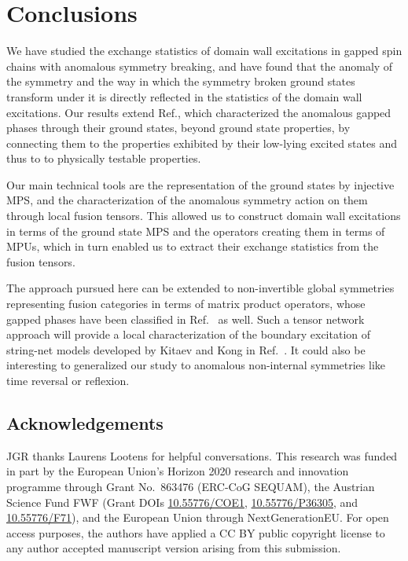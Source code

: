 \documentclass[aps,pra,export,nofootinbib]{revtex4-2}
\begin{document}
\section{Conclusions}
We have studied the exchange statistics of domain wall excitations in gapped spin chains with anomalous symmetry breaking, and have found that the anomaly of the symmetry and the way in which the symmetry broken ground states transform under it is directly reflected in the statistics of the domain wall excitations.  Our results extend Ref.\cite{Garre22}, which characterized the anomalous gapped phases through their ground states, beyond ground state properties, by connecting them to the properties exhibited by their low-lying excited states and thus to to physically testable properties.

Our main technical tools are the representation of the ground states by injective MPS, and the characterization of the anomalous symmetry action on them through local fusion tensors. This allowed us to construct domain wall excitations in terms of the ground state MPS and the operators creating them in terms of MPUs, which in turn enabled us to extract their exchange statistics from the fusion tensors.

The approach pursued here can be extended to non-invertible global symmetries representing fusion categories in terms of matrix product operators, whose gapped phases have been classified in Ref.~\cite{Garre22} as well. Such a tensor network approach will provide a local characterization of the boundary excitation of string-net models developed by Kitaev and Kong in Ref.~\cite{Kitaev12}. It could also be interesting to generalized our study to anomalous non-internal symmetries like time reversal or reflexion.



\subsection*{Acknowledgements}
JGR thanks Laurens Lootens for helpful conversations. 
%
This research was funded in part by 
the  European Union’s Horizon 2020 research and innovation programme through Grant No.\ 863476 (ERC-CoG SEQUAM),
the Austrian Science Fund FWF
(Grant DOIs \href{https://doi.org/10.55776/COE1}{10.55776/COE1}, \href{https://doi.org/10.55776/P36305}{10.55776/P36305}, and \href{https://doi.org/10.55776/F71}{10.55776/F71}), and the European Union through NextGenerationEU.
%
For open access purposes, the authors have applied a CC BY public copyright 
license to any author accepted manuscript version arising from this submission.



\end{document}

